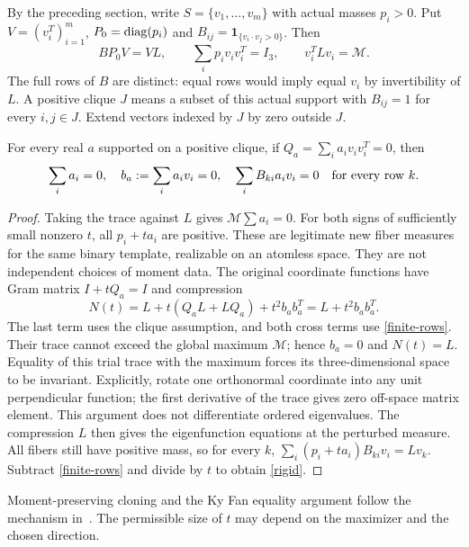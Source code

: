 By the preceding section, write $S=\{v_1,\ldots,v_m\}$ with actual masses
$p_i>0$. Put $V=(v_i^T)_{i=1}^m$, $P_0=\operatorname{diag}(p_i)$ and
$B_{ij}=\mathbf1_{\{v_i\cdot v_j>0\}}$. Then
\begin{equation}\label{finite-rows}
 BP_0V=VL,\qquad \sum_i p_iv_iv_i^T=I_3,\qquad
 v_i^TLv_i=\mathcal M.
\end{equation}
The full rows of $B$ are distinct: equal rows would imply equal $v_i$
by invertibility of $L$. A positive clique $J$ means a subset of this actual support with $B_{ij}=1$
for every $i,j\in J$. Extend vectors indexed by $J$ by zero outside $J$.
\begin{lemma}
For every real $a$ supported on a positive clique, if
$Q_a=\sum_i a_i v_iv_i^T=0$, then
\begin{equation}
 \sum_i a_i=0,\quad b_a:=\sum_i a_iv_i=0,\quad
 \sum_i B_{ki}a_iv_i=0\quad\hbox{for every row }k. \label{rigid}
\end{equation}
\end{lemma}
\begin{proof}
Taking the trace against $L$ gives $\mathcal M\sum a_i=0$.
For both signs of sufficiently small nonzero $t$, all $p_i+ta_i$ are positive.
These are legitimate new fiber measures for the same binary template, realizable
on an atomless space. They are not independent choices of moment data.
The original coordinate functions have Gram matrix $I+tQ_a=I$ and compression
\[
 N(t)=L+t(Q_aL+LQ_a)+t^2b_ab_a^T=L+t^2b_ab_a^T.
\]
The last term uses the clique assumption, and both cross terms use \eqref{finite-rows}.
Their trace cannot exceed the global maximum $\mathcal M$; hence $b_a=0$ and $N(t)=L$.
Equality of this trial trace with the maximum forces its three-dimensional
space to be invariant. Explicitly, rotate one orthonormal coordinate into any
unit perpendicular function; the first derivative of the trace gives zero
off-space matrix element. This argument does not differentiate ordered eigenvalues.
The compression $L$ then gives the eigenfunction equations at the perturbed measure.
All fibers still have positive mass, so for every $k$,
$\sum_i(p_i+ta_i)B_{ki}v_i=Lv_k$.
Subtract \eqref{finite-rows} and divide by $t$ to obtain \eqref{rigid}.
\end{proof}
Moment-preserving cloning and the Ky Fan equality argument follow the
mechanism in~\cite[Claims 2.2--2.5]{KMMP}. The permissible size of $t$
may depend on the maximizer and the chosen direction.
